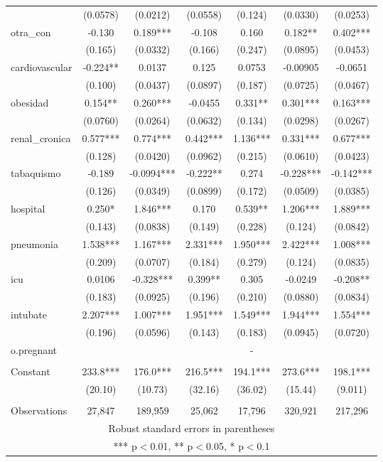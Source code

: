\documentclass[]{article}
\begin{document}
\begin{tabular}{lcccccc}
 & (0.0578) & (0.0212) & (0.0558) & (0.124) & (0.0330) & (0.0253) \\
otra\_con & -0.130 & 0.189*** & -0.108 & 0.160 & 0.182** & 0.402*** \\
 & (0.165) & (0.0332) & (0.166) & (0.247) & (0.0895) & (0.0453) \\
cardiovascular & -0.224** & 0.0137 & 0.125 & 0.0753 & -0.00905 & -0.0651 \\
 & (0.100) & (0.0437) & (0.0897) & (0.187) & (0.0725) & (0.0467) \\
obesidad & 0.154** & 0.260*** & -0.0455 & 0.331** & 0.301*** & 0.163*** \\
 & (0.0760) & (0.0264) & (0.0632) & (0.134) & (0.0298) & (0.0267) \\
renal\_cronica & 0.577*** & 0.774*** & 0.442*** & 1.136*** & 0.331*** & 0.677*** \\
 & (0.128) & (0.0420) & (0.0962) & (0.215) & (0.0610) & (0.0423) \\
tabaquismo & -0.189 & -0.0994*** & -0.222** & 0.274 & -0.228*** & -0.142*** \\
 & (0.126) & (0.0349) & (0.0899) & (0.172) & (0.0509) & (0.0385) \\
hospital & 0.250* & 1.846*** & 0.170 & 0.539** & 1.206*** & 1.889*** \\
 & (0.143) & (0.0838) & (0.149) & (0.228) & (0.124) & (0.0842) \\
pneumonia & 1.538*** & 1.167*** & 2.331*** & 1.950*** & 2.422*** & 1.008*** \\
 & (0.209) & (0.0707) & (0.184) & (0.279) & (0.124) & (0.0835) \\
icu & 0.0106 & -0.328*** & 0.399** & 0.305 & -0.0249 & -0.208** \\
 & (0.183) & (0.0925) & (0.196) & (0.210) & (0.0880) & (0.0834) \\
intubate & 2.207*** & 1.007*** & 1.951*** & 1.549*** & 1.944*** & 1.554*** \\
 & (0.196) & (0.0596) & (0.143) & (0.183) & (0.0945) & (0.0720) \\
o.pregnant &  &  &  & - &  &  \\
 &  &  &  &  &  &  \\
Constant & 233.8*** & 176.0*** & 216.5*** & 194.1*** & 273.6*** & 198.1*** \\
 & (20.10) & (10.73) & (32.16) & (36.02) & (15.44) & (9.011) \\
 &  &  &  &  &  &  \\
 Observations & 27,847 & 189,959 & 25,062 & 17,796 & 320,921 & 217,296 \\ \hline
\multicolumn{7}{c}{ Robust standard errors in parentheses} \\
\multicolumn{7}{c}{ *** p$<$0.01, ** p$<$0.05, * p$<$0.1} \\
\end{tabular}
\end{document}
